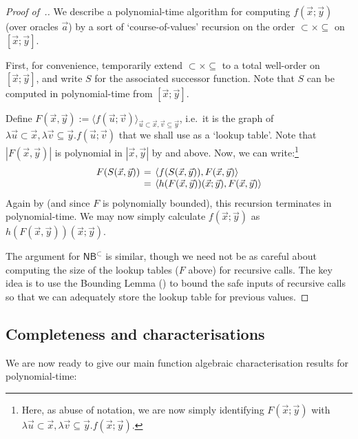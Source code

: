 \documentclass[manuscript,screen]{acmart}
\newcommand{\dfn}{:=}
\theoremstyle{definition}
\theoremstyle{remark}
\newcommand{\permpref}{\subset}
\newcommand{\permprefeq}{\subseteq}
\newcommand{\bc}{\mathsf{B}}
\newcommand{\bcwfpo}[1]{\bc^{#1}}
\newcommand{\nested}{\mathsf{N}}
\newcommand{\nbcwfpo}[1]{\nested\bcwfpo{#1}}
\newcommand{\nbcpp}{\nbcwfpo{\permpref}}
\begin{document}
\begin{proof}[Proof of~.]
We describe a polynomial-time algorithm for computing $f(\vec x;\vec y)$ (over oracles $\vec a$) by a sort of `course-of-values' recursion on the order $\permpref \times \permprefeq $ on $[\vec x;\vec y]$.

First, for convenience, temporarily extend $\permpref \times \permprefeq$ to a total well-order on $[\vec x;\vec y]$, and write $S$ for the associated successor function.
    Note that $S$ can be computed in polynomial-time from $[\vec x;\vec y]$.


Define $F(\vec x,\vec y) \dfn \langle f(\vec u;\vec v)\rangle_{\vec u \permpref \vec x, \vec v \permprefeq \vec y}$, i.e.\ it is the graph of $\lambda \vec u \permpref \vec x, \lambda \vec v \permprefeq \vec y . f(\vec u;\vec v)$ that we shall use as a `lookup table'.
    Note that $|F(\vec x,\vec y)| $ is polynomial in $|\vec x,\vec y|$ by  and  above.
    Now, we can write:\footnote{Here, as abuse of notation, we are now simply identifying $F(\vec x;\vec y)$ with $\lambda \vec u \permpref \vec x, \lambda \vec v \permprefeq \vec y . f(\vec x;\vec y)$.}
    \[
    \arraycolsep=2pt
    \begin{array}{rcl}
        F(S(\vec x,\vec y)) & =&  \langle f(S(\vec x,\vec y)), F(\vec x,\vec y) \rangle  \\
        & = & \langle h(F(\vec x ,\vec y))(\vec x;\vec y),F(\vec x,\vec y)\rangle
    \end{array}
    \]
    Again by  (and since $F$ is polynomially bounded), this recursion terminates in polynomial-time.
    We may now simply calculate $f(\vec x;\vec y)$ as $h(F(\vec x,\vec y))(\vec x;\vec y)$.
    
The argument for $\nbcpp$ is similar, though we need not be as careful about computing the size of the lookup tables ($F$ above) for recursive calls.
The key idea is to use the Bounding Lemma () to bound the safe inputs of recursive calls so that we can adequately store the lookup table for previous values.
\end{proof}


\subsection{Completeness and characterisations}
We are now ready to give our main function algebraic characterisation results for polynomial-time:
\end{document}
